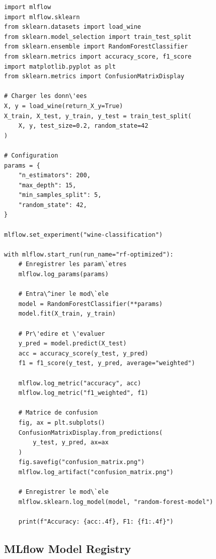 \begin{codeblock}[title=\textbf{Exemple complet~: classification avec MLflow}]
\begin{verbatim}
import mlflow
import mlflow.sklearn
from sklearn.datasets import load_wine
from sklearn.model_selection import train_test_split
from sklearn.ensemble import RandomForestClassifier
from sklearn.metrics import accuracy_score, f1_score
import matplotlib.pyplot as plt
from sklearn.metrics import ConfusionMatrixDisplay

# Charger les donn\'ees
X, y = load_wine(return_X_y=True)
X_train, X_test, y_train, y_test = train_test_split(
    X, y, test_size=0.2, random_state=42
)

# Configuration
params = {
    "n_estimators": 200,
    "max_depth": 15,
    "min_samples_split": 5,
    "random_state": 42,
}

mlflow.set_experiment("wine-classification")

with mlflow.start_run(run_name="rf-optimized"):
    # Enregistrer les param\`etres
    mlflow.log_params(params)

    # Entra\^iner le mod\`ele
    model = RandomForestClassifier(**params)
    model.fit(X_train, y_train)

    # Pr\'edire et \'evaluer
    y_pred = model.predict(X_test)
    acc = accuracy_score(y_test, y_pred)
    f1 = f1_score(y_test, y_pred, average="weighted")

    mlflow.log_metric("accuracy", acc)
    mlflow.log_metric("f1_weighted", f1)

    # Matrice de confusion
    fig, ax = plt.subplots()
    ConfusionMatrixDisplay.from_predictions(
        y_test, y_pred, ax=ax
    )
    fig.savefig("confusion_matrix.png")
    mlflow.log_artifact("confusion_matrix.png")

    # Enregistrer le mod\`ele
    mlflow.sklearn.log_model(model, "random-forest-model")

    print(f"Accuracy: {acc:.4f}, F1: {f1:.4f}")
\end{verbatim}
\end{codeblock}

\subsection{MLflow Model Registry}

